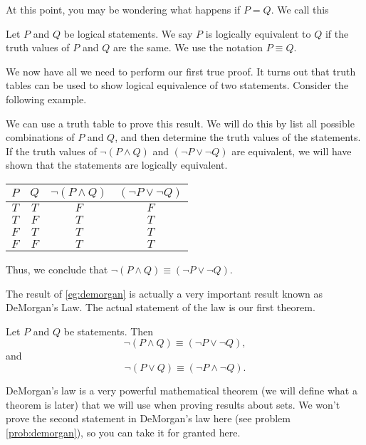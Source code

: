 At this point, you may be wondering what happens if $P = Q$. We call this

\begin{definition}{}
	Let $P$ and $Q$ be logical statements. We say $P$ is logically equivalent to $Q$ if the truth values of $P$ and $Q$ are the same. We use the notation $P\equiv Q$.
\end{definition}

\noindent We now have all we need to perform our first true proof. It turns out that truth tables can be used to show logical equivalence of two statements. Consider the following example.

\begin{example}{}\label{eg:demorgan}
	We can use a truth table to prove this result. We will do this by list all possible combinations of $P$ and $Q$, and then determine the truth values of the statements. If the truth values of $\neg(P \land Q)$ and $(\neg P \lor \neg Q)$ are equivalent, we will have shown that the statements are logically equivalent.
	\begin{center}
		\begin{tabular}{c | c | c | c}
			$P$ & $Q$ & $\neg(P \land Q)$ & $(\neg P \lor \neg Q)$ \\
			\hline
			$T$ & $T$ & $F$               & $F$                    \\
			$T$ & $F$ & $T$               & $T$                    \\
			$F$ & $T$ & $T$               & $T$                    \\
			$F$ & $F$ & $T$               & $T$
		\end{tabular}
	\end{center}
	Thus, we conclude that $\neg(P \land Q) \equiv (\neg P \lor \neg Q)$.
\end{example}

The result of \cref{eg:demorgan} is actually a very important result known as DeMorgan's Law. The actual statement of the law is our first theorem.

\begin{namedtheorem}\label{thm:demorgan}
	Let $P$ and $Q$ be statements. Then
	\[\neg(P \land Q) \equiv (\neg P \lor \neg Q),\] and
	\[\neg(P\lor Q)\equiv (\neg P \land \neg Q).\]
\end{namedtheorem}

DeMorgan's law is a very powerful mathematical theorem (we will define what a theorem is later) that we will use when proving results about sets. We won't prove the second statement in DeMorgan's law here (see problem \ref{prob:demorgan}), so you can take it for granted here.

